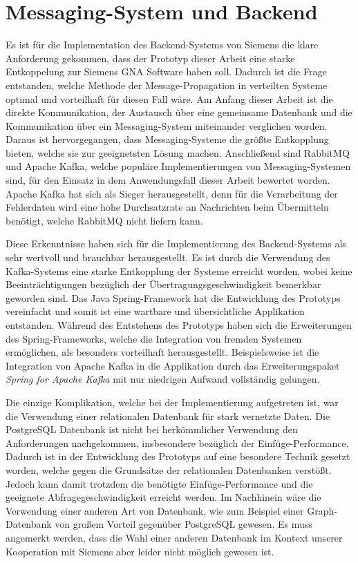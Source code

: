 \section{Messaging-System und Backend}
\label{chp:assessment_backend}

Es ist für die Implementation des Backend-Systems von Siemens die klare Anforderung gekommen, dass der Prototyp dieser Arbeit eine starke Entkoppelung zur Siemens GNA Software haben soll. Dadurch ist die Frage entstanden, welche Methode der Message-Propagation in verteilten Systeme optimal und vorteilhaft für diesen Fall wäre. Am Anfang dieser Arbeit ist die direkte Kommunikation, der Austausch über eine gemeinsame Datenbank und die Kommunikation über ein Messaging-System miteinander verglichen worden. Daraus ist hervorgegangen, dass Messaging-Systeme die größte Entkopplung bieten, welche sie zur geeignetsten Lösung machen. Anschließend sind RabbitMQ und Apache Kafka, welche populäre Implementierungen von Messaging-Systemen sind, für den Einsatz in dem Anwendungsfall dieser Arbeit bewertet worden. Apache Kafka hat sich als Sieger herausgestellt, denn für die Verarbeitung der Fehlerdaten wird eine hohe Durchsatzrate an Nachrichten beim Übermitteln benötigt, welche RabbitMQ nicht liefern kann. 

Diese Erkenntnisse haben sich für die Implementierung des Backend-Systems als sehr wertvoll und brauchbar herausgestellt. Es ist durch die Verwendung des Kafka-Systems eine starke Entkopplung der Systeme erreicht worden, wobei keine Beeinträchtigungen bezüglich der Übertragungsgeschwindigkeit bemerkbar geworden sind. Das Java Spring-Framework hat die Entwicklung des Prototyps vereinfacht und somit ist eine wartbare und übersichtliche Applikation entstanden. Während des Entstehens des Prototyps haben sich die Erweiterungen des Spring-Frameworks, welche die Integration von fremden Systemen ermöglichen, als besonders vorteilhaft herausgestellt. Beispielsweise ist die Integration von Apache Kafka in die Applikation durch das Erweiterungspaket \emph{Spring for Apache Kafka} mit nur niedrigen Aufwand vollständig gelungen.

Die einzige Komplikation, welche bei der Implementierung aufgetreten ist, war die Verwendung einer relationalen Datenbank für stark vernetzte Daten. Die PostgreSQL Datenbank ist nicht bei herkömmlicher Verwendung den Anforderungen nachgekommen, insbesondere bezüglich der Einfüge-Performance. Dadurch ist in der Entwicklung des Prototyps auf eine besondere Technik gesetzt worden, welche gegen die Grundsätze der relationalen Datenbanken verstößt. Jedoch kann damit trotzdem die benötigte Einfüge-Performance und die geeignete Abfragegeschwindigkeit erreicht werden. Im Nachhinein wäre die Verwendung einer anderen Art von Datenbank, wie zum Beispiel einer Graph-Datenbank von großem Vorteil gegenüber PostgreSQL gewesen. Es muss angemerkt werden, dass die Wahl einer anderen Datenbank im Kontext unserer Kooperation mit Siemens aber leider nicht möglich gewesen ist.